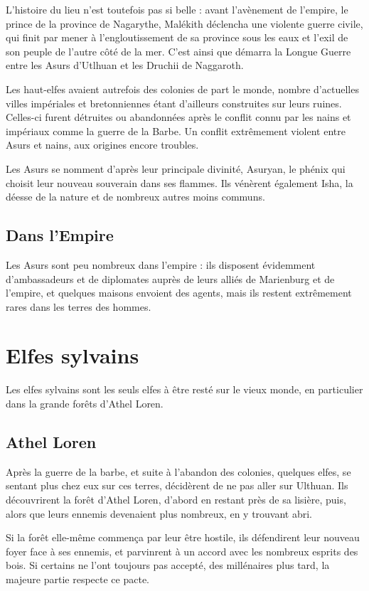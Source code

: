 \documentclass[10pt,a4paper]{book}
\begin{document}
L'histoire du lieu n'est toutefois pas si belle : avant l'avènement de l'empire, le prince de la province de Nagarythe, Malékith déclencha une violente guerre civile, qui finit par mener à l'engloutissement de sa province sous les eaux et l'exil de son peuple de l'autre côté de la mer. C'est ainsi que démarra la Longue Guerre entre les Asurs d'Utlhuan et les Druchii de Naggaroth.

Les haut-elfes avaient autrefois des colonies de part le monde, nombre d'actuelles villes impériales et bretonniennes étant d'ailleurs construites sur leurs ruines. Celles-ci furent détruites ou abandonnées après le conflit connu par les nains et impériaux comme la guerre de la Barbe. Un conflit extrêmement violent entre Asurs et nains, aux origines encore troubles.

Les Asurs se nomment d'après leur principale divinité, Asuryan, le phénix qui choisit leur nouveau souverain dans ses flammes. Ils vénèrent également Isha, la déesse de la nature et de nombreux autres moins communs.
\section{Dans l'Empire}
Les Asurs sont peu nombreux dans l'empire : ils disposent évidemment d'ambassadeurs et de diplomates auprès de leurs alliés de Marienburg et de l'empire, et quelques maisons envoient des agents, mais ils restent extrêmement rares dans les terres des hommes.
\chapter{Elfes sylvains}
Les elfes sylvains sont les seuls elfes à être resté sur le vieux monde, en particulier dans la grande forêts d'Athel Loren.
\section{Athel Loren}
Après la guerre de la barbe, et suite à l'abandon des colonies, quelques elfes, se sentant plus chez eux sur ces terres, décidèrent de ne pas aller sur Ulthuan. Ils découvrirent la forêt d'Athel Loren, d'abord en restant près de sa lisière, puis, alors que leurs ennemis devenaient plus nombreux, en y trouvant abri.

Si la forêt elle-même commença par leur être hostile, ils défendirent leur nouveau foyer face à ses ennemis, et parvinrent à un accord avec les nombreux esprits des bois. Si certains ne l'ont toujours pas accepté, des millénaires plus tard, la majeure partie respecte ce pacte.
\end{document}
